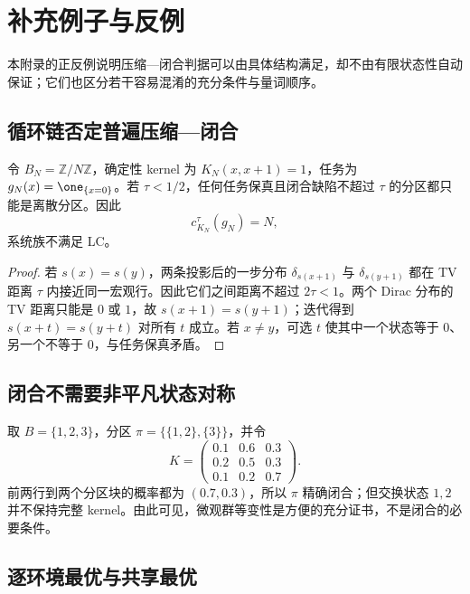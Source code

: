 \section{补充例子与反例}
\label{app:examples-counterexamples}

本附录的正反例说明压缩—闭合判据可以由具体结构满足，却不由有限状态性自动保证；它们也区分若干容易混淆的充分条件与量词顺序。

\subsection{循环链否定普遍压缩—闭合}

\begin{counterexample}[有限性不推出低复杂度]
\label{counter:cycle}
令 $B_N=\mathbb Z/N\mathbb Z$，确定性 kernel 为
$K_N(x,x+1)=1$，任务为 $g_N(x)=\one_{\{x=0\}}$。若 $\tau<1/2$，任何任务保真且闭合缺陷不超过 $\tau$ 的分区都只能是离散分区。因此
\[
c_{K_N}^{\tau}(g_N)=N,
\]
系统族不满足 LC。
\end{counterexample}

\begin{proof}
若 $s(x)=s(y)$，两条投影后的一步分布 $\delta_{s(x+1)}$ 与 $\delta_{s(y+1)}$ 都在 TV 距离 $\tau$ 内接近同一宏观行。因此它们之间距离不超过 $2\tau<1$。两个 Dirac 分布的 TV 距离只能是 $0$ 或 $1$，故 $s(x+1)=s(y+1)$；迭代得到 $s(x+t)=s(y+t)$ 对所有 $t$ 成立。若 $x\ne y$，可选 $t$ 使其中一个状态等于 $0$、另一个不等于 $0$，与任务保真矛盾。
\end{proof}

\subsection{闭合不需要非平凡状态对称}

\begin{example}[无交换对称的闭合商]
取 $B=\{1,2,3\}$，分区 $\pi=\{\{1,2\},\{3\}\}$，并令
\[
K=\begin{pmatrix}
0.1&0.6&0.3\\
0.2&0.5&0.3\\
0.1&0.2&0.7
\end{pmatrix}.
\]
前两行到两个分区块的概率都为 $(0.7,0.3)$，所以 $\pi$ 精确闭合；但交换状态 $1,2$ 并不保持完整 kernel。由此可见，微观群等变性是方便的充分证书，不是闭合的必要条件。
\end{example}

\subsection{逐环境最优与共享最优}

